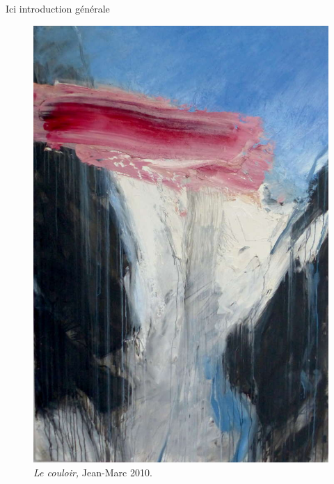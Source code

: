 Ici introduction générale

\begin{figure}
  \centering
  \includegraphics{./figures/Le_couloir_Rochette.jpg}
  \caption{\emph{Le couloir,} Jean-Marc  2010.}
  \label{fig:couloir_rochette}
\end{figure}